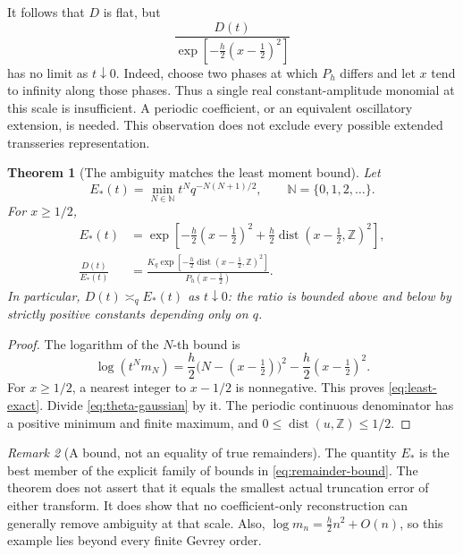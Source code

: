 \documentclass[11pt,a4paper]{article}
\numberwithin{equation}{section}
\newtheorem{theorem}{Theorem}[section]
\theoremstyle{definition}
\theoremstyle{remark}
\newtheorem{remark}[theorem]{Remark}
\newcommand{\N}{\mathbb N}
\newcommand{\Z}{\mathbb Z}
\newcommand{\dist}{\operatorname{dist}}
\begin{document}
It follows that \(D\) is flat, but
\begin{equation}
 \frac{D(t)}{\exp[-\frac h2(x-\frac12)^2]}
 \label{eq:nonlimit}
\end{equation}
has no limit as \(t\downarrow0\). Indeed, choose two phases at which
\(P_h\) differs and let \(x\) tend to infinity along those phases.
Thus a single real constant-amplitude monomial at this scale is
insufficient. A periodic coefficient, or an equivalent oscillatory
extension, is needed. This observation does not exclude every possible
extended transseries representation.

\begin{theorem}[The ambiguity matches the least moment bound]
\label{thm:least}
Let
\begin{equation}
 E_*(t)=\min_{N\in\N} t^Nq^{-N(N+1)/2},
 \qquad \N=\{0,1,2,\ldots\}.
 \label{eq:least-bound}
\end{equation}
For \(x\ge1/2\),
\begin{align}
 E_*(t)&=\exp\!\left[-\frac h2(x-\tfrac12)^2
              +\frac h2\dist(x-\tfrac12,\Z)^2\right],
 \label{eq:least-exact}\\
 \frac{D(t)}{E_*(t)}
 &=\frac{K_q\exp[-\frac h2\dist(x-\tfrac12,\Z)^2]}
           {P_h(x-\tfrac12)}.\label{eq:least-ratio}
\end{align}
In particular, \(D(t)\asymp_q E_*(t)\) as \(t\downarrow0\): the ratio
is bounded above and below by strictly positive constants depending
only on \(q\).
\end{theorem}
\begin{proof}
The logarithm of the \(N\)-th bound is
\[
 \log(t^Nm_N)=\frac h2\bigl(N-(x-\tfrac12)\bigr)^2
                      -\frac h2(x-\tfrac12)^2.
\]
For \(x\ge1/2\), a nearest integer to \(x-1/2\) is nonnegative. This
proves \eqref{eq:least-exact}. Divide \eqref{eq:theta-gaussian} by it.
The periodic continuous denominator has a positive minimum and finite
maximum, and \(0\le\dist(u,\Z)\le1/2\).
\end{proof}

\begin{remark}[A bound, not an equality of true remainders]
The quantity \(E_*\) is the best member of the explicit family of
bounds in \eqref{eq:remainder-bound}. The theorem does not assert that
it equals the smallest actual truncation error of either transform.
It does show that no coefficient-only reconstruction can generally
remove ambiguity at that scale. Also,
\(\log m_n=\frac h2n^2+O(n)\), so this example lies beyond every finite
Gevrey order.
\end{remark}
\end{document}
